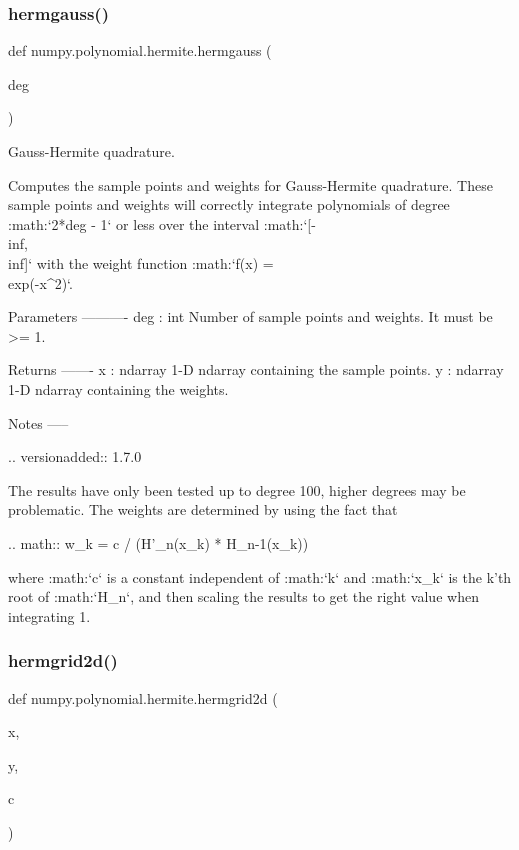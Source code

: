 \subsubsection{\texorpdfstring{hermgauss()}{hermgauss()}}
{\footnotesize\ttfamily def numpy.\+polynomial.\+hermite.\+hermgauss (\begin{DoxyParamCaption}\item[{}]{deg }\end{DoxyParamCaption})}

\begin{DoxyVerb}Gauss-Hermite quadrature.

Computes the sample points and weights for Gauss-Hermite quadrature.
These sample points and weights will correctly integrate polynomials of
degree :math:`2*deg - 1` or less over the interval :math:`[-\\inf, \\inf]`
with the weight function :math:`f(x) = \\exp(-x^2)`.

Parameters
----------
deg : int
    Number of sample points and weights. It must be >= 1.

Returns
-------
x : ndarray
    1-D ndarray containing the sample points.
y : ndarray
    1-D ndarray containing the weights.

Notes
-----

.. versionadded:: 1.7.0

The results have only been tested up to degree 100, higher degrees may
be problematic. The weights are determined by using the fact that

.. math:: w_k = c / (H'_n(x_k) * H_{n-1}(x_k))

where :math:`c` is a constant independent of :math:`k` and :math:`x_k`
is the k'th root of :math:`H_n`, and then scaling the results to get
the right value when integrating 1.\end{DoxyVerb}
 \mbox{\label{namespacenumpy_1_1polynomial_1_1hermite_aeefd1ef748aeb65aea9cd696e6f1e474}} 
\subsubsection{\texorpdfstring{hermgrid2d()}{hermgrid2d()}}
{\footnotesize\ttfamily def numpy.\+polynomial.\+hermite.\+hermgrid2d (\begin{DoxyParamCaption}\item[{}]{x,  }\item[{}]{y,  }\item[{}]{c }\end{DoxyParamCaption})}

